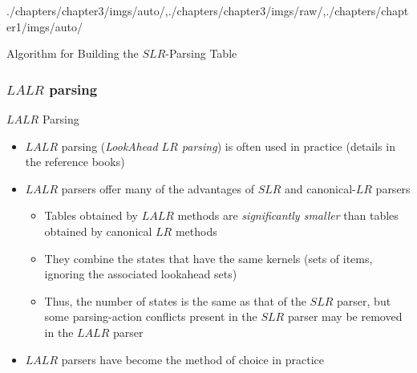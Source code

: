 \begin{graphicspathcontext}{{./chapters/chapter3/imgs/auto/},{./chapters/chapter3/imgs/raw/},{./chapters/chapter1/imgs/auto/}}
\begin{bibunit}[apalike]
\begin{frame}[t]{Algorithm for Building the $SLR$-Parsing Table}
	\tiny\larger
	\vspace{-.24cm}
	\begin{myalgorithm}
	\end{myalgorithm}
\end{frame}

\subsubsection{$LALR$ parsing}
\subsubsectiontableofcontentslide

\begin{frame}[background={10}]{$LALR$ Parsing}
	\begin{itemize}
	\item $LALR$ parsing (\emph{LookAhead $LR$ parsing}) is often used in practice (details in the reference books)
	\item $LALR$ parsers offer many of the advantages of $SLR$ and canonical-$LR$ parsers
		\begin{itemize}
		\item Tables obtained by $LALR$ methods are \emph{significantly smaller} than tables obtained by canonical $LR$ methods
		\item They combine the states that have the same kernels (sets of items, ignoring the associated lookahead sets)
		\item Thus, the number of states is the same as that of the $SLR$ parser, but some parsing-action conflicts present in the $SLR$ parser may be removed in the $LALR$ parser
		\end{itemize}
	\item $LALR$ parsers have become the method of choice in practice
	\end{itemize}
\end{frame}


\end{bibunit}
\end{graphicspathcontext}
